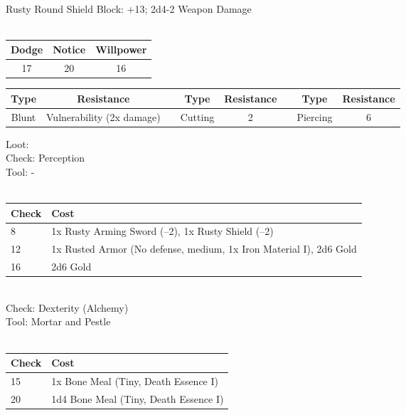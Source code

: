 \\
Rusty Round Shield Block: +13; 2d4-2 Weapon Damage\\
\\
\begin{minipage}[H]{1\textwidth}
    \centering
    \begin{tabular}[c]{|c | c | c|}
        \hline
        Dodge & Notice & Willpower\\
        \hline
        17 & 20 & 16\\
        \hline
    \end{tabular}
\end{minipage}
\begin{minipage}[H]{1\textwidth}
    \centering
    \begin{tabular}[c]{|c | c | c | c | c | c | c | c|}
        \hline
        Type & Resistance && Type & Resistance && Type & Resistance\\
        \hline
        Blunt & Vulnerability (2x damage) &&
        Cutting & 2 &&
        Piercing & 6\\
        \hline
    \end{tabular}
\end{minipage}
Loot:\\
Check: Perception\\
Tool: -\\
\\
\begin{minipage}{0.8\textwidth}
    \begin{tabular}{|l | l|}
        \hline
        Check & Cost\\
        \hline
        8 & 1x Rusty Arming Sword (--2), 1x Rusty Shield (--2)\\
        12 & 1x Rusted Armor (No defense, medium, 1x Iron Material I), 2d6 Gold\\
        16 & 2d6 Gold\\
        \hline
    \end{tabular}
\end{minipage}
\\
Check: Dexterity (Alchemy)\\
Tool: Mortar and Pestle\\
\\
\begin{minipage}{0.8\textwidth}
    \begin{tabular}{|l | l|}
        \hline
        Check & Cost\\
        \hline
        15 & 1x Bone Meal (Tiny, Death Essence I)\\
        20 & 1d4 Bone Meal (Tiny, Death Essence I)\\
        \hline
    \end{tabular}
\end{minipage}
\pagebreak